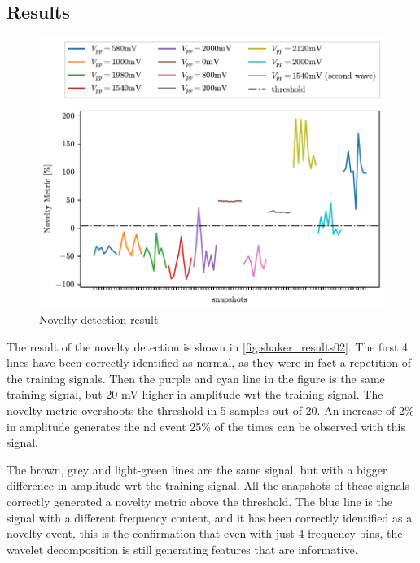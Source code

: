 \subsection{Results}
\begin{figure}
    \centering
    \includegraphics{Images/shaker/Test02.pdf}
    \caption{Novelty detection result}
    \label{fig:shaker_results02}
\end{figure}
The result of the novelty detection is shown in \autoref{fig:shaker_results02}. The first 4 lines have been correctly identified as normal, as they were in fact a repetition of the training signals.
Then the purple and cyan line in the figure is the same training signal, but 20 mV higher in amplitude \gls{wrt} the training signal. The novelty metric overshoots the threshold in 5 samples out of 20. An increase of 2\% in amplitude generates the \gls{nd} event 25\% of the times can be observed with this signal. 

The brown, grey and light-green lines are the same signal, but with a bigger difference in amplitude \gls{wrt} the training signal. All the snapshots of these signals correctly generated a novelty metric above the threshold. The blue line is the signal with a different frequency content, and it has been correctly identified as a novelty event, this is the confirmation that even with just 4 frequency bins, the wavelet decomposition is still generating features that are informative.

